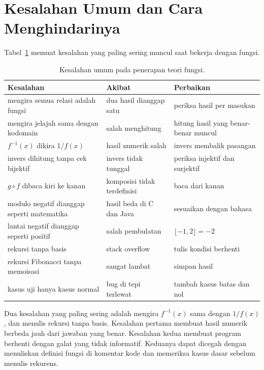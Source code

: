 \documentclass[11pt,a4paper]{article}
\begin{document}
\section{Kesalahan Umum dan Cara Menghindarinya}

Tabel~\ref{tab:kesalahan} memuat kesalahan yang paling sering muncul saat bekerja dengan fungsi.

\begin{table}[H]
	\centering
	\caption{Kesalahan umum pada penerapan teori fungsi.}
	\label{tab:kesalahan}
	\footnotesize
	\begin{tabularx}{\textwidth}{l X X}
		\toprule
		Kesalahan                                  & Akibat                      & Perbaikan                            \\
		\midrule
		mengira semua relasi adalah fungsi         & dua hasil dianggap satu     & periksa hasil per masukan            \\
		mengira jelajah sama dengan kodomain       & salah menghitung            & hitung hasil yang benar-benar muncul \\
		$f^{-1}(x)$ dikira $1/f(x)$                & hasil numerik salah         & invers membalik pasangan             \\
		invers dihitung tanpa cek bijektif         & invers tidak tunggal        & periksa injektif dan surjektif       \\
		$g \circ f$ dibaca kiri ke kanan           & komposisi tidak terdefinisi & baca dari kanan                      \\
		modulo negatif dianggap seperti matematika & hasil beda di C dan Java    & sesuaikan dengan bahasa              \\
		lantai negatif dianggap seperti positif    & salah pembulatan            & $\lfloor -1{,}2 \rfloor=-2$          \\
		rekursi tanpa basis                        & stack overflow              & tulis kondisi berhenti               \\
		rekursi Fibonacci tanpa memoisasi          & sangat lambat               & simpan hasil                         \\
		kasus uji hanya kasus normal               & bug di tepi terlewat        & tambah kasus batas dan nol           \\
		\bottomrule
	\end{tabularx}
\end{table}

Dua kesalahan yang paling sering adalah mengira $f^{-1}(x)$ sama dengan $1/f(x)$, dan menulis rekursi tanpa basis. Kesalahan pertama membuat hasil numerik berbeda jauh dari jawaban yang benar. Kesalahan kedua membuat program berhenti dengan galat yang tidak informatif. Keduanya dapat dicegah dengan menuliskan definisi fungsi di komentar kode dan memeriksa kasus dasar sebelum menulis rekurens.
\end{document}
